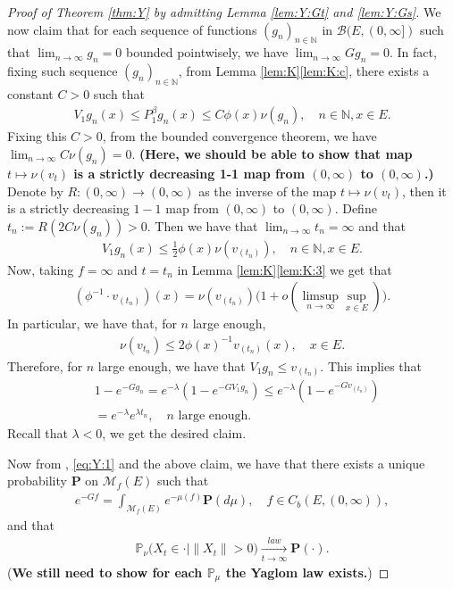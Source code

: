 \documentclass[12pt,a4paper]{amsart}
\numberwithin{equation}{section}
\theoremstyle{plain}
\theoremstyle{definition}
\begin{document}
\begin{proof}[Proof of Theorem \ref{thm:Y} by admitting Lemma \ref{lem:Y:Gt} and \ref{lem:Y:Gs}]
We now claim that for each sequence of functions $(g_{n})_{n\in \mathbb N}$ in $\mathcal B(E, (0,\infty])$ such that $\lim_{n \to \infty} g_n = 0$ bounded pointwisely, we have $\lim_{n \to \infty} G g_n = 0$.
In fact, fixing such sequence $(g_{n})_{n\in \mathbb N}$, from Lemma \ref{lem:K}\ref{lem:K:c}, there exists a constant $C > 0$ such that 
\begin{align}
	V_1 g_n(x) \leq P^\beta_1 g_n(x) \leq C \phi(x) \nu(g_n),
  \quad n \in \mathbb N, x\in E.
\end{align}
Fixing this $C>0$, from the bounded convergence theorem, we have $\lim_{n\to \infty}C \nu(g_n) =0$.
{\bf (Here, we should be able to show that map $t \mapsto \nu(v_t)$ is a strictly decreasing 1-1 map from $(0,\infty)$ to $(0,\infty)$.)}
Denote by $R:(0,\infty) \to (0,\infty)$ as the inverse of the map $t \mapsto \nu(v_t)$, then it is a strictly decreasing $1-1$ map from $(0,\infty)$ to $(0,\infty)$. 
Define $t_n := R(2C\nu(g_n))> 0$.
Then we have that $\lim_{n\to \infty} t_n = \infty$ and that 
\begin{align}
	V_1 g_n(x) \leq \frac{1}{2} \phi(x) \nu(v_{(t_n)}), 
\quad n \in \mathbb N, x\in E.
\end{align}
Now, taking $f = \infty$ and $t = t_n$ in Lemma \ref{lem:K}\eqref{lem:K:3} we get that
\begin{align}
 (\phi^{-1} \cdot v_{(t_n)})(x) 
  = \nu(v_{(t_n)}) \big( 1+ o(\limsup_{n\to \infty} \sup_{x\in E}) \big).
\end{align}
In particular, we have that, for $n$ large enough,
\begin{align}
	\nu(v_{t_n}) \leq 2 \phi(x)^{-1} v_{(t_n)}(x), \quad x\in E.
\end{align}
Therefore, for $n$ large enough, we have that $V_1g_n \leq v_{(t_n)}$.
This implies that
\begin{align}
	& 1 - e^{- Gg_n}
  = e^{- \lambda} (1- e^{- GV_1g_n})
  \leq e^{- \lambda} (1- e^{- G v_{(t_n)}}) \\
  & = e^{- \lambda} e^{\lambda t_n},
  \quad \text{$n$ large enough.}
\end{align} 
Recall that $\lambda < 0$, we get the desired claim.

Now from \cite[Proposition 1.19]{Li2011MeasureValued}, \eqref{eq:Y:1} and the above claim, we have that there exists a unique probability $\mathbf P$ on $\mathcal M_f(E)$ such that 
\begin{align}
  e^{-Gf}
  = \int_{\mathcal M_f(E)} e^{- \mu(f)} \mathbf P(d\mu)
  , \quad f\in C_b(E, (0,\infty)),
\end{align}
and that
\begin{align}
	\mathbb P_{\nu}\big(X_t \in \cdot \big| \|X_t\|>0 \big) 
  \xrightarrow[t\to \infty]{law} \mathbf P(\cdot).
\end{align}
({\bf We still need to show for each $\mathbb P_\mu$ the Yaglom law exists.})
\end{proof}
\end{document}
